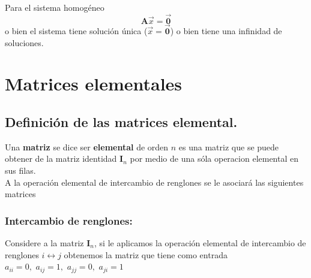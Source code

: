 \documentclass[
]{article}
\begin{document}
Para el sistema homogéneo \[
  \mathbf{A}\vec{x} = \vec{\mathbf{0}}
  \] o bien el sistema tiene solución única
(\(\vec{x}=\vec{\mathbf{0}}\)) o bien tiene una infinidad de soluciones.

\hypertarget{matrices-elementales}{%
\section{Matrices elementales}\label{matrices-elementales}}

\small

\hypertarget{definiciuxf3n-de-las-matrices-elemental.}{%
\subsection{Definición de las matrices
elemental.}\label{definiciuxf3n-de-las-matrices-elemental.}}

Una \textbf{matriz} se dice ser \textbf{elemental} de orden \(n\) es una
matriz que se puede obtener de la matriz identidad \(\mathbf{I}_n\) por
medio de una sóla operacion elemental en sus filas.\\
A la operación elemental de intercambio de renglones se le asociará las
siguientes matrices

\hypertarget{intercambio-de-renglones}{%
\subsubsection{Intercambio de
renglones:}\label{intercambio-de-renglones}}

Considere a la matriz \(\mathbf{I}_n\), si le aplicamos la operación
elemental de intercambio de renglones \(i\leftrightarrow j\) obtenemos
la matriz que tiene como entrada
\(a_{ii}=0,\,\, a_{ij}=1,\,\, a_{jj}=0,\,\, a_{ji}=1\)
\end{document}
